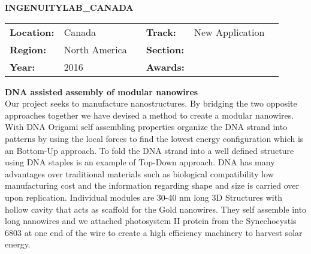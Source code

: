 \textbf{\uppercase{IngenuityLab\_Canada}} \FloatBarrier \begin{table}[h] \begin{tabular}{lp{2.5cm}llll} \textbf{Location:} & Canada & \multicolumn{1}{|l}{} & \textbf{Track:}   & New Application \\ \textbf{Region:}   & North America   & \multicolumn{1}{|l}{} & \textbf{Section:} &  \\ \textbf{Year:}     & 2016   & \multicolumn{1}{|l}{} & \textbf{Awards:}  & \end{tabular} \end{table} \FloatBarrier \noindent\textbf{DNA assisted assembly of modular nanowires} \vspace{.2cm}\\ 
Our project seeks to manufacture nanostructures. By bridging the two opposite approaches together we have devised a method to create a modular nanowires. With DNA Origami self assembling properties organize the DNA strand into patterns by using the local forces to find the lowest energy configuration which is an Bottom-Up approach. To fold the DNA strand into a well defined structure using DNA staples is an example of Top-Down approach. DNA has many advantages over traditional materials such as biological compatibility low manufacturing cost and the information regarding shape and size is carried over upon replication. Individual modules are 30-40 nm long 3D Structures with hollow cavity that acts as scaffold for the Gold nanowires. They self assemble into long nanowires and we attached photosystem II protein from the Synechocystis 6803 at one end of the wire to create a high efficiency machinery to harvest solar energy.
\vspace{2cm}

